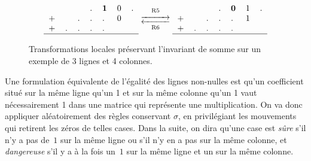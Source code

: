 \begin{figure}[hbt]
{\begin{minipage}{0.6\textwidth}
\[
\begin{tabular}{lllllll}
&&&.&\textbf 1&0&. \\
+&&.&.&.&0&\\
+&.&.&.&.&&\\
\hline
\end{tabular}
\mathrel{\mathop{\longrightleftarrows}^{\mathrm{R5}}_{\mathrm{R6}}}
\begin{tabular}{lllllll}
&&&.&\textbf 0&1&. \\
+&&.&.&.&1&\\
+&.&.&.&.&&\\
\hline
\end{tabular}
\]
\end{minipage}}

\caption{Transformations locales préservant l'invariant de somme sur un exemple
  de 3 lignes et 4 colonnes.}

\label{fig:rules}

\end{figure}



Une  formulation  équivalente  de  l'égalité  des lignes  non-nulles  est  qu'un
coefficient situé sur la même ligne qu'un  1 et sur la même colonne qu'un 1 vaut
nécessairement 1 dans une matrice  qui représente une multiplication. On va donc
appliquer  aléatoirement des  règles  conservant $\sigma$,  en privilégiant  les
mouvements qui retirent les zéros de telles cases. Dans la suite, on dira qu'une
case est \emph{sûre}  s'il n'y a pas de~$1$  sur la même ligne ou s'il  n'y en a
pas sur la même  colonne, et \emph{dangereuse} s'il y a à  la fois un~$1$ sur la
même ligne et un sur la même colonne.

